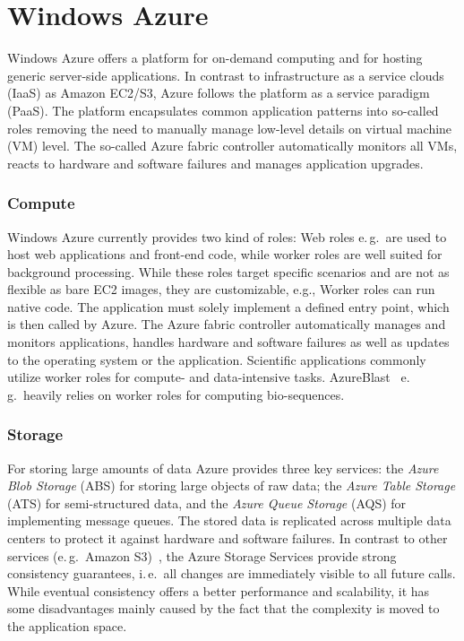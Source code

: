 \documentclass[conference,final]{IEEEtran}
\newcommand{\up}{\vspace*{-1em}}
\begin{document}
\section{Windows Azure}
\label{sec:azure}
\up
Windows Azure offers a platform for on-demand computing and for
hosting generic server-side applications.  In contrast to
infrastructure as a service clouds (IaaS) as Amazon EC2/S3, Azure
follows the platform as a service paradigm (PaaS).  The platform
encapsulates common application patterns into so-called roles removing
the need to manually manage low-level details on virtual machine (VM)
level.  The so-called Azure fabric controller automatically monitors
all VMs, reacts to hardware and software failures and manages
application upgrades.

\subsubsection{Compute}

Windows Azure currently provides two kind of 
roles: Web roles e.\,g.\ are used to host web applications and
front-end code, while worker roles are well suited for background
processing. While these roles target specific scenarios and are not as
flexible as bare EC2 images, they are customizable, %
e.g., Worker roles can run native code. The application must solely
implement a defined entry point, which is then called by Azure. The
Azure fabric controller automatically manages and monitors
applications, handles hardware and software failures as well as
updates to the operating system or the application.  Scientific
applications commonly utilize worker roles for compute- and
data-intensive tasks. AzureBlast~\cite{azure_blast} e.\,g.\ heavily
relies on worker roles for computing bio-sequences.

\subsubsection{Storage}

For storing large amounts of data Azure provides three key services:
the \emph{Azure Blob Storage} (ABS) for storing large objects of raw
data; the \emph{Azure Table Storage} (ATS) for semi-structured data, and the
\emph{Azure Queue Storage} (AQS) for implementing message queues.  The
stored data is %
replicated across multiple data centers to protect it against hardware
and software failures. In contrast to other services (e.\,g.\ Amazon
S3)~\cite{1294281}, the Azure Storage Services provide strong
consistency guarantees, i.\,e.\ all changes are immediately visible to
all future calls. While eventual consistency offers a better
performance and scalability, it has some disadvantages mainly caused
by the fact that the complexity is moved to the application space.
\end{document}

